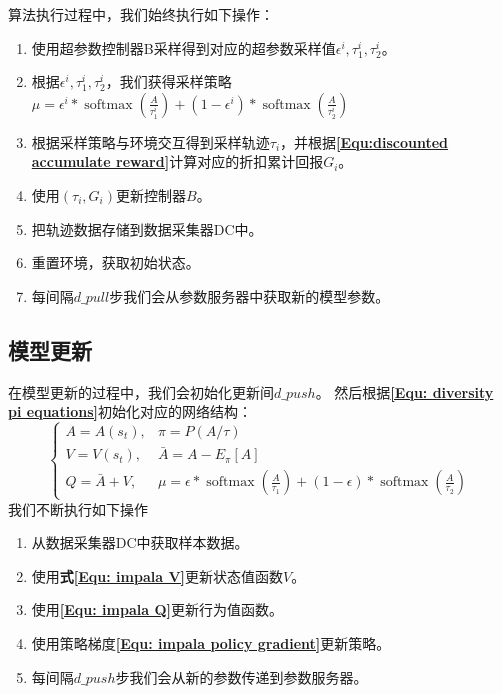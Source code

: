 算法执行过程中，我们始终执行如下操作：
\begin{enumerate}
    \item 使用超参数控制器B采样得到对应的超参数采样值$\epsilon^i,\tau_1^i,\tau_2^i$。
    \item 根据$\epsilon^i,\tau_1^i,\tau_2^i$，我们获得采样策略$\mu=\epsilon^i * \operatorname{softmax}\left(\frac{A}{\tau_{1}^i}\right)+(1-\epsilon^i) * \operatorname{softmax}\left(\frac{A}{\tau_{2}^i}\right)$
    \item 根据采样策略与环境交互得到采样轨迹$\tau_i$，并根据\textbf{\eqref{Equ:discounted accumulate reward}}计算对应的折扣累计回报$G_i$。
    \item 使用$(\tau_i,G_i)$更新控制器$B$。
    \item 把轨迹数据存储到数据采集器DC中。
    \item 重置环境，获取初始状态。
    \item 每间隔$d\_pull$步我们会从参数服务器中获取新的模型参数。
\end{enumerate}
    
\subsection{模型更新}
在模型更新的过程中，我们会初始化更新间$d\_push$。
然后根据\textbf{\eqref{Equ: diversity pi equations}}初始化对应的网络结构：
\begin{equation}
    \left\{\begin{array}{ll}
A=A\left(s_{t}\right), & \pi=P(A / \tau) \\

V=V\left(s_{t}\right), & \bar{A}=A-E_{\pi}[A] \\

 Q=\bar{A}+V, & \mu=\epsilon * \operatorname{softmax}\left(\frac{A}{\tau_{1}}\right)+(1-\epsilon) * \operatorname{softmax}\left(\frac{A}{\tau_{2}}\right)
\end{array}\right.
\end{equation}
我们不断执行如下操作
\begin{enumerate}
    \item 从数据采集器DC中获取样本数据。
    \item 使用\textbf{式\eqref{Equ: impala V}}更新状态值函数$V$。
    \item 使用\textbf{\eqref{Equ: impala Q}}更新行为值函数。
    \item 使用策略梯度\textbf{\eqref{Equ: impala policy gradient}}更新策略。
    \item 每间隔$d\_push$步我们会从新的参数传递到参数服务器。
\end{enumerate}
